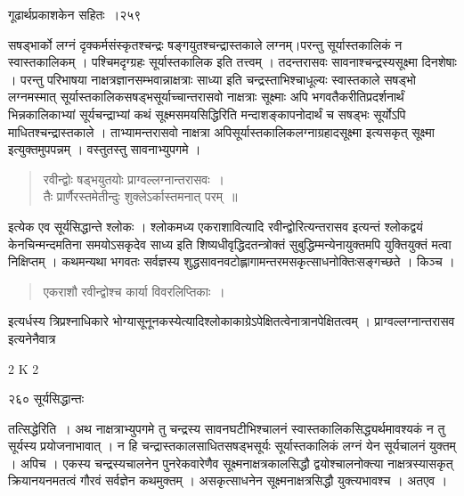 \documentclass[11pt, openany]{book}
\begin{document}
\newpage


\hspace{3cm} गूढार्थप्रकाशकेन सहितः~।\hfill २५९
\vspace{1cm}

%
\noindent सषड्भार्को लग्नं दृक्कर्मसंस्कृतश्चन्द्रः षङ्गयुतश्चन्द्रास्तकाले लग्नम्।परन्तु सूर्यास्तकालिकं न स्वास्तकालिकम् । पश्चिमदृग्ग्रहः सूर्यास्तकालिक इति तत्त्वम् । तदन्तरासवः सावनाश्चन्द्रस्यसूक्ष्मा दिनशेषाः । परन्तु परिभाषया नाक्षत्रज्ञानसम्भवान्नाक्षत्राः साध्या इति चन्द्रस्ताभिश्चाधूल्यः स्वास्तकाले सषड्भो लग्नमस्मात् सूर्यास्तकालिकसषड्भसूर्याच्चान्तरासवो नाक्षत्राः सूक्ष्माः अपि भगवतैकरीतिप्रदर्शनार्थं भिन्नकालिकाभ्यां सूर्यचन्द्राभ्यां कथं सूक्ष्मसमयसिद्धिरिति मन्दाशङ्कापनोदार्थं च सषड्भः सूर्योऽपि माधितश्चन्द्रास्तकाले । ताभ्यामन्तरासवो नाक्षत्रा अपिसूर्यास्तकालिकलग्नाग्रहादसूक्ष्मा इत्यसकृत् सूक्ष्मा इत्युक्तमुपपन्नम् । वस्तुतस्तु सावनाभ्युपगमे । 

\begin{quote}
{\qt  रवीन्द्वोः षड्भयुतयोः प्राग्वल्लग्नान्तरासवः~।\\ 
तैः प्रार्णैरस्तमेतीन्दुः शुक्लेऽर्कास्तमनात् परम्~॥}
\end{quote}

 इत्येक एव सूर्यसिद्धान्ते श्लोकः । श्लोकमध्य एकराशावित्यादि रवीन्द्वोरित्यन्तरासव इत्यन्तं श्लोकद्वयं केनचिन्मन्दमतिना समयोऽसकृदेव साध्य इति शिष्यधीवृद्धिदतन्त्रोक्तं सुबुद्धिम्मन्येनायुक्तमपि युक्तियुक्तं मत्वा निक्षिप्तम् । कथमन्यथा भगवतः सर्वज्ञस्य शुद्धसावनवटोह्लागामन्तरमसकृत्साधनोक्तिःसङ्गच्छते । किञ्च ।

\begin{quote}
{\qt एकराशौ रवीन्द्वोश्च कार्या विवरलिप्तिकाः~। }
\end{quote}

 इत्यर्धस्य त्रिप्रश्नाधिकारे भोग्यासूनूनकस्येत्यादिश्लोकाकाग्रेऽपेक्षितत्वेनात्रानपेक्षितत्वम् । प्राग्वल्लग्नान्तरासव इत्यनेनैवात्र\textendash 
%

{\tiny{2 K 2}}


\newpage

\noindent २६० \hspace{4cm} सूर्यसिद्धान्तः
\vspace{1cm}


\noindent तत्सिद्धेरिति~। अथ नाक्षत्राभ्युपगमे तु चन्द्रस्य सावनघटीभिश्चालनं स्वास्तकालिकसिद्ध्यर्थमावश्यकं न तु सूर्यस्य प्रयोजनाभावात् । न हि चन्द्रास्तकालसाधितसषड्भसूर्यः सूर्यास्तकालिकं लग्नं येन सूर्यचालनं युक्तम् । अपिच । एकस्य चन्द्रस्यचालनेन पुनरेकवारेणैव सूक्ष्मनाक्षत्रकालसिद्धौ द्वयोश्चालनोक्त्या नाक्षत्रस्यासकृत् क्रियानयनमतत्वं गौरवं सर्वज्ञेन कथमुक्तम् । असकृत्साधनेन सूक्ष्मनाक्षत्रसिद्धौ युक्त्यभावश्च । अतएव ।
\end{document}
